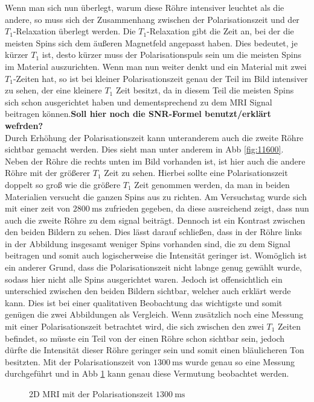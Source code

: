 Wenn man sich nun überlegt, warum diese Röhre intensiver leuchtet als die andere, so muss sich der Zusammenhang zwischen der Polarisationszeit und der $T_1$-Relaxation überlegt werden. Die $T_1$-Relaxation gibt die Zeit an, bei der die meisten Spins sich dem äußeren Magnetfeld angepasst haben. Dies bedeutet, je kürzer $T_1$ ist, desto kürzer muss der Polarisationspuls sein um die meisten Spins im Material auszurichten. Wenn man nun weiter denkt und ein Material mit zwei $T_1$-Zeiten hat, so ist bei kleiner Polarisationszeit genau der Teil im Bild intensiver zu sehen, der eine kleinere $T_1$ Zeit besitzt, da in diesem Teil die meisten Spins sich schon ausgerichtet haben und dementsprechend zu dem MRI Signal beitragen können.\textbf{Soll hier noch die SNR-Formel benutzt/erklärt wefrden?}\\
Durch Erhöhung der Polarisationszeit kann unteranderem auch die zweite Röhre sichtbar gemacht werden. Dies sieht man unter anderem in Abb \ref{fig:11600}. Neben der Röhre die rechts unten im Bild vorhanden ist, ist hier auch die andere Röhre mit der größerer $T_1$ Zeit zu sehen. Hierbei sollte eine Polarisationszeit doppelt so groß wie die größere $T_1$ Zeit genommen werden, da man in beiden Materialien versucht die ganzen Spins aus zu richten. Am Versuchstag wurde sich mit einer zeit von $\SI{2800}{\milli\second}$ zufrieden gegeben, da diese ausreichend zeigt, dass nun auch die zweite Röhre zu dem signal beiträgt. Dennoch ist ein Kontrast zwischen den beiden Bildern zu sehen. Dies lässt darauf schließen, dass in der Röhre links in der Abbildung insgesamt weniger Spins vorhanden sind, die zu dem Signal beitragen und somit auch logischerweise die Intensität geringer ist. Womöglich ist ein anderer Grund, dass die Polarisationszeit nicht labnge genug gewählt wurde, sodass hier nicht alle Spins ausgerichtet waren. Jedoch ist offensichtlich ein unterschied zwischen den beiden Bildern sichtbar, welcher auch erklärt werde kann. Dies ist bei einer qualitativen Beobachtung das wichtigste und somit genügen die zwei Abbildungen als Vergleich. Wenn zusätzlich noch eine Messung mit einer Polarisationszeit betrachtet wird, die sich zwischen den zwei $T_1$ Zeiten befindet, so müsste ein Teil von der einen Röhre schon sichtbar sein, jedoch dürfte die Intensität dieser Röhre geringer sein und somit einen bläulicheren Ton besitzten. Mit der Polarisationszeit von $\SI{1300}{\milli\second}$ wurde genau so eine Messung durchgeführt und in Abb \ref{fig: 1300} kann genau diese Vermutung beobachtet werden.
    \begin{figure}[H]
        \centering
        
        \caption{2D MRI mit der Polarisationszeit $\SI{1300}{\milli\second}$}
        \label{fig: 1300}
    \end{figure}
